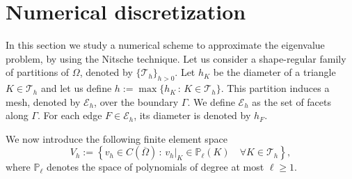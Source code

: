 \documentclass[onefignum,onetabnum,final]{siamart250211}
\def\CT{\mathcal{T}}
\numberwithin{equation}{section}
\newcommand\0{\boldsymbol{0}}
\renewcommand\O{\Omega}
\def\CE{{\mathcal E}}
\def\CT{{\mathcal T}}
\begin{document}
	
	\section{Numerical discretization}
	\label{sec:fem}
	In this section we study a numerical scheme to approximate the eigenvalue problem, by using the Nitsche technique. Let us consider a shape-regular family of partitions of $\O$, denoted by $\{\mathcal{T}_h\}_{h>0}$.  Let $h_K$ be the diameter of a triangle  $K\in\CT_h$ and let us define $h:=\max\{h_K\,:\, K\in \CT_h\}$.  This partition induces a mesh, denoted by $\CE_h$, over the boundary $\Gamma$. We define $\CE_h$ as the set of facets along $\Gamma$. For each edge $F\in \CE_{h}$, its diameter is denoted by $h_F$.
	
	
	We now introduce the following finite element space
	\begin{equation*}
		V_h:=\left\{v_h\in C(\overline{\Omega}) \,:\, v_h\vert_K\in\mathbb{P}_\ell(K)\quad
		\forall K\in\CT_{h}\right\},
	\end{equation*}
	where $\mathbb{P}_\ell$ denotes the space of polynomials of degree at most $\ell\geq1$.
	
\end{document}

